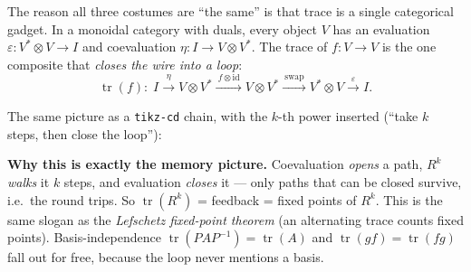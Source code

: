 \documentclass[11pt]{article}
\newcommand{\tr}{\operatorname{tr}}
\newcommand{\id}{\mathrm{id}}
\newcommand{\lc}[1]{\texttt{\small #1}}
\begin{document}
The reason all three costumes are ``the same'' is that trace is a single
categorical gadget. In a monoidal category with duals, every object $V$ has an
evaluation $\varepsilon:V^*\otimes V\to I$ and coevaluation
$\eta:I\to V\otimes V^*$. The trace of $f:V\to V$ is the one composite that
\emph{closes the wire into a loop}:
\[
\tr(f):\; I \xrightarrow{\ \eta\ } V\otimes V^*
        \xrightarrow{\ f\otimes\id\ } V\otimes V^*
        \xrightarrow{\ \mathrm{swap}\ } V^*\otimes V
        \xrightarrow{\ \varepsilon\ } I .
\]

\begin{center}
\end{center}

\noindent The same picture as a \lc{tikz-cd} chain, with the $k$-th power
inserted (``take $k$ steps, then close the loop''):
\begin{center}
\end{center}

\begin{note}\small
\textbf{Why this is exactly the memory picture.} Coevaluation \emph{opens} a
path, $R^k$ \emph{walks} it $k$ steps, and evaluation \emph{closes} it --- only
paths that can be closed survive, i.e.\ the round trips. So $\tr(R^k)$ =
feedback = fixed points of $R^k$. This is the same slogan as the
\emph{Lefschetz fixed-point theorem} (an alternating trace counts fixed points).
Basis-independence $\tr(PAP^{-1})=\tr(A)$ and $\tr(gf)=\tr(fg)$ fall out for
free, because the loop never mentions a basis.
\end{note}
\end{document}
